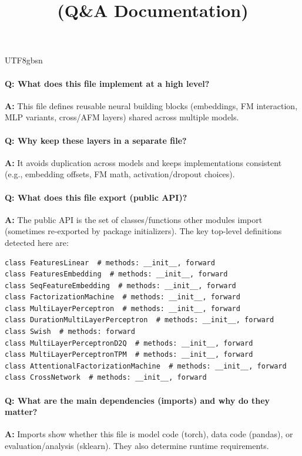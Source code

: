 \documentclass[11pt]{article}
\title{\texttt{\detokenize{model/layers.py}} (Q\&A Documentation)}
\author{}
\date{}
\begin{document}
\begin{CJK*}{UTF8}{gbsn}
\maketitle

\paragraph{Q: What does this file implement at a high level?}
\textbf{A:} This file defines reusable neural building blocks (embeddings, FM interaction, MLP variants, cross/AFM layers) shared across multiple models.

\paragraph{Q: Why keep these layers in a separate file?}
\textbf{A:} It avoids duplication across models and keeps implementations consistent (e.g., embedding offsets, FM math, activation/dropout choices).

\paragraph{Q: What does this file export (public API)?}
\textbf{A:} The public API is the set of classes/functions other modules import (sometimes re-exported by package initializers). The key top-level definitions detected here are:

\begin{Verbatim}[fontsize=\small]
class FeaturesLinear  # methods: __init__, forward
class FeaturesEmbedding  # methods: __init__, forward
class SeqFeatureEmbedding  # methods: __init__, forward
class FactorizationMachine  # methods: __init__, forward
class MultiLayerPerceptron  # methods: __init__, forward
class DurationMultiLayerPerceptron  # methods: __init__, forward
class Swish  # methods: forward
class MultiLayerPerceptronD2Q  # methods: __init__, forward
class MultiLayerPerceptronTPM  # methods: __init__, forward
class AttentionalFactorizationMachine  # methods: __init__, forward
class CrossNetwork  # methods: __init__, forward
\end{Verbatim}

\paragraph{Q: What are the main dependencies (imports) and why do they matter?}
\textbf{A:} Imports show whether this file is model code (torch), data code (pandas), or evaluation/analysis (sklearn). They also determine runtime requirements.


\end{CJK*}
\end{document}
